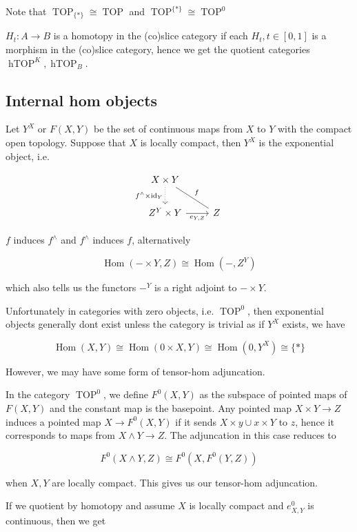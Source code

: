 \documentclass[12pt]{article}
\DeclareMathOperator{\id}{id}
\DeclareMathOperator{\Hom}{Hom}
\DeclareMathOperator{\TOP}{TOP}
\DeclareMathOperator{\hTOP}{hTOP}
\begin{document}
Note that $\TOP_{\{*\}}\cong\TOP$ and $\TOP^{\{*\}}\cong\TOP^0$

$H_t:A\to B$ is a homotopy in the (co)slice category if each $H_t,t\in[0,1]$ is a morphism in the (co)slice category, hence we get the quotient categories $\hTOP^K,\hTOP_B$.

\subsection{Internal hom objects}

Let $Y^X$ or $F(X,Y)$ be the set of continuous maps from $X$ to $Y$ with the compact open topology. Suppose that $X$ is locally compact, then $Y^X$ is the exponential object, i.e.

\[\begin{tikzcd}
    X\times Y \arrow[rd, "f", no head] \arrow[d, "f^\wedge\times\id_Y"', dotted] &   \\
    Z^Y\times Y \arrow[r, "{e_{Y,Z}}"']                                         & Z
\end{tikzcd}\]

$f$ induces $f^\wedge$ and $f^\wedge$ induces $f$, alternatively

\[\Hom\left(-\times Y,Z\right)\cong\Hom\left(-,Z^Y\right)\]

which also tells us the functors $-^Y$ is a right adjoint to $-\times Y$.

Unfortunately in categories with zero objects, i.e. $\TOP^0$, then exponential objects generally dont exist unless the category is trivial as if $Y^X$ exists, we have

\[\Hom(X,Y)\cong\Hom\left(0\times X,Y\right)\cong\Hom\left(0,Y^X\right)\cong\{*\}\]

However, we may have some form of tensor-hom adjuncation.

In the category $\TOP^0$, we define $F^0(X,Y)$ as the subspace of pointed maps of $F(X,Y)$ and the constant map is the basepoint. Any pointed map $X\times Y\to Z$ induces a pointed map $X\to F^0(X,Y)$ if it sends $X\times y\cup x\times Y$ to $z$, hence it corresponds to maps from $X\wedge Y\to Z$. The adjuncation in this case reduces to

\[F^0\left(X\wedge Y,Z\right)\cong F^0\left(X,F^0\left(Y,Z\right)\right)\]

when $X,Y$ are locally compact. This gives us our tensor-hom adjuncation.

If we quotient by homotopy and assume $X$ is locally compact and $e_{X,Y}^0$ is continuous, then we get
\end{document}
